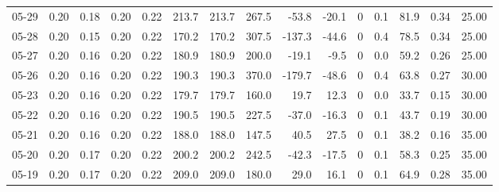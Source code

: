\begin{threeparttable}
{\begin{tabular}{lrrrrrrrrrrrrrr}
  05-29 &          0.20 &          0.18 &          0.20 &        0.22 &               213.7 &              213.7 &               267.5 &      -53.8 &        -20.1 &              0 &                 0.1 &             81.9 &            0.34 &                  25.00 \\
  05-28 &          0.20 &          0.15 &          0.20 &        0.22 &               170.2 &              170.2 &               307.5 &     -137.3 &        -44.6 &              0 &                 0.4 &             78.5 &            0.34 &                  25.00 \\
  05-27 &          0.20 &          0.16 &          0.20 &        0.22 &               180.9 &              180.9 &               200.0 &      -19.1 &         -9.5 &              0 &                 0.0 &             59.2 &            0.26 &                  25.00 \\
  05-26 &          0.20 &          0.16 &          0.20 &        0.22 &               190.3 &              190.3 &               370.0 &     -179.7 &        -48.6 &              0 &                 0.4 &             63.8 &            0.27 &                  30.00 \\
  05-23 &          0.20 &          0.16 &          0.20 &        0.22 &               179.7 &              179.7 &               160.0 &       19.7 &         12.3 &              0 &                 0.0 &             33.7 &            0.15 &                  30.00 \\
  05-22 &          0.20 &          0.16 &          0.20 &        0.22 &               190.5 &              190.5 &               227.5 &      -37.0 &        -16.3 &              0 &                 0.1 &             43.7 &            0.19 &                  30.00 \\
  05-21 &          0.20 &          0.16 &          0.20 &        0.22 &               188.0 &              188.0 &               147.5 &       40.5 &         27.5 &              0 &                 0.1 &             38.2 &            0.16 &                  35.00 \\
  05-20 &          0.20 &          0.17 &          0.20 &        0.22 &               200.2 &              200.2 &               242.5 &      -42.3 &        -17.5 &              0 &                 0.1 &             58.3 &            0.25 &                  35.00 \\
  05-19 &          0.20 &          0.17 &          0.20 &        0.22 &               209.0 &              209.0 &               180.0 &       29.0 &         16.1 &              0 &                 0.1 &             64.9 &            0.28 &                  35.00 \\

\end{tabular}}
\end{threeparttable}
